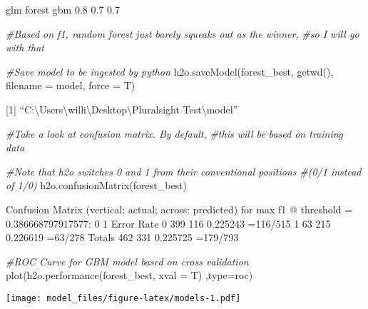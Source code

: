 \documentclass[
]{article}
\newenvironment{Shaded}{\begin{snugshade}}{\end{snugshade}}
\newcommand{\AttributeTok}[1]{\textcolor[rgb]{0.77,0.63,0.00}{#1}}
\newcommand{\CommentTok}[1]{\textcolor[rgb]{0.56,0.35,0.01}{\textit{#1}}}
\newcommand{\FunctionTok}[1]{\textcolor[rgb]{0.00,0.00,0.00}{#1}}
\newcommand{\NormalTok}[1]{#1}
\newcommand{\StringTok}[1]{\textcolor[rgb]{0.31,0.60,0.02}{#1}}
\begin{document}
glm forest gbm 0.8 0.7 0.7

\begin{Shaded}
\begin{Highlighting}[]
\CommentTok{\#Based on f1, random forest just barely squeaks out as the winner,}
\CommentTok{\#so I will go with that}

\CommentTok{\#Save model to be ingested by python }
\FunctionTok{h2o.saveModel}\NormalTok{(forest\_best, }\FunctionTok{getwd}\NormalTok{(), }\AttributeTok{filename =} \StringTok{\textquotesingle{}model\textquotesingle{}}\NormalTok{, }\AttributeTok{force =}\NormalTok{ T)}
\end{Highlighting}
\end{Shaded}

{[}1{]}
``C:\textbackslash Users\textbackslash willi\textbackslash Desktop\textbackslash Pluralsight
Test\textbackslash model''

\begin{Shaded}
\begin{Highlighting}[]
\CommentTok{\#Take a look at confusion matrix. By default,}
\CommentTok{\#this will be based on training data}

\CommentTok{\#Note that h2o switches 0 and 1 from their conventional positions }
\CommentTok{\#(0/1 instead of 1/0)}
\FunctionTok{h2o.confusionMatrix}\NormalTok{(forest\_best)}
\end{Highlighting}
\end{Shaded}

Confusion Matrix (vertical: actual; across: predicted) for max f1 @
threshold = 0.386668797917577: 0 1 Error Rate 0 399 116 0.225243
=116/515 1 63 215 0.226619 =63/278 Totals 462 331 0.225725 =179/793

\begin{Shaded}
\begin{Highlighting}[]
\CommentTok{\#ROC Curve for GBM model based on cross validation }
\FunctionTok{plot}\NormalTok{(}\FunctionTok{h2o.performance}\NormalTok{(forest\_best, }\AttributeTok{xval =}\NormalTok{ T) ,}\AttributeTok{type=}\StringTok{\textquotesingle{}roc\textquotesingle{}}\NormalTok{)}
\end{Highlighting}
\end{Shaded}

\texttt{[image: model\_files/figure-latex/models-1.pdf]}
\end{document}
